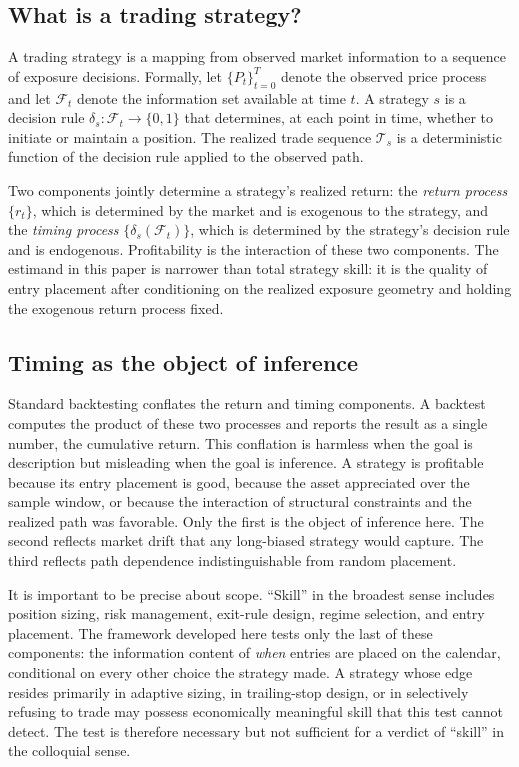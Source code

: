 \documentclass[preprint,12pt]{elsarticle}
\theoremstyle{definition}
\begin{document}
\subsection{What is a trading strategy?}

A trading strategy is a mapping from observed market information to a sequence of exposure decisions. Formally, let $\{P_t\}_{t=0}^{T}$ denote the observed price process and let $\mathcal{F}_t$ denote the information set available at time $t$. A strategy $s$ is a decision rule $\delta_s: \mathcal{F}_t \to \{0,1\}$ that determines, at each point in time, whether to initiate or maintain a position. The realized trade sequence $\mathcal{T}_s$ is a deterministic function of the decision rule applied to the observed path.

Two components jointly determine a strategy's realized return: the \emph{return process} $\{r_t\}$, which is determined by the market and is exogenous to the strategy, and the \emph{timing process} $\{\delta_s(\mathcal{F}_t)\}$, which is determined by the strategy's decision rule and is endogenous. Profitability is the interaction of these two components. The estimand in this paper is narrower than total strategy skill: it is the quality of entry placement after conditioning on the realized exposure geometry and holding the exogenous return process fixed.

\subsection{Timing as the object of inference}

Standard backtesting conflates the return and timing components. A backtest computes the product of these two processes and reports the result as a single number, the cumulative return. This conflation is harmless when the goal is description but misleading when the goal is inference. A strategy is profitable because its entry placement is good, because the asset appreciated over the sample window, or because the interaction of structural constraints and the realized path was favorable. Only the first is the object of inference here. The second reflects market drift that any long-biased strategy would capture. The third reflects path dependence indistinguishable from random placement.

It is important to be precise about scope. ``Skill'' in the broadest sense includes position sizing, risk management, exit-rule design, regime selection, and entry placement. The framework developed here tests only the last of these components: the information content of \emph{when} entries are placed on the calendar, conditional on every other choice the strategy made. A strategy whose edge resides primarily in adaptive sizing, in trailing-stop design, or in selectively refusing to trade may possess economically meaningful skill that this test cannot detect. The test is therefore necessary but not sufficient for a verdict of ``skill'' in the colloquial sense.
\end{document}
